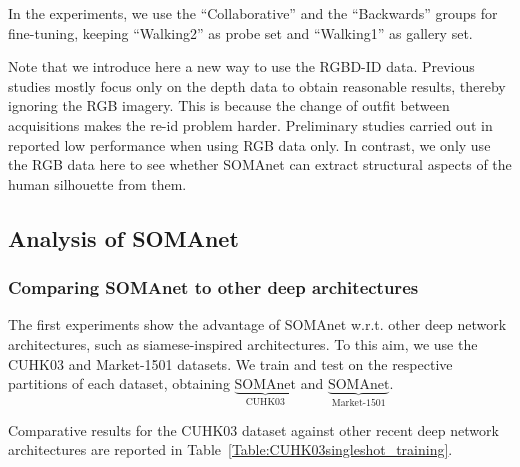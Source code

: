 \documentclass[10pt,journal,letterpaper,compsoc]{IEEEtran}
\newcommand{\ts}[2]{$\underbrace{\text{#1}}_\text{#2}$}
\begin{document}
In the experiments, we use the ``Collaborative'' and the ``Backwards'' groups for fine-tuning, keeping ``Walking2'' as probe set and ``Walking1'' as gallery set.

Note that we introduce here a new way to use the RGBD-ID data. Previous studies mostly focus only on the depth data to obtain reasonable results, thereby ignoring the RGB imagery. This is because the change of outfit between acquisitions makes the re-id problem harder. Preliminary studies carried out in~\cite{barbosa2012re} reported low performance when using RGB data only. In contrast, we only use the RGB data here to see whether SOMAnet can extract structural aspects of the human silhouette from them.


\subsection{Analysis of SOMAnet}\label{Sec:SOMAnetEvaluation}

\subsubsection{Comparing SOMAnet to other deep architectures}\label{Sec:vsDeep}

The first experiments show the advantage of SOMAnet w.r.t. other deep network architectures, such as siamese-inspired architectures. To this aim, we use the CUHK03 and Market-1501 datasets. We train and test on the respective partitions of each dataset, obtaining \ts{SOMAnet}{CUHK03} and \ts{SOMAnet}{Market-1501}.

Comparative results for the CUHK03 dataset against other recent deep network architectures are reported in Table~\ref{Table:CUHK03singleshot_training}.
\end{document}
